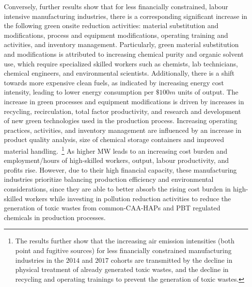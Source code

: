 \documentclass[12pt, english]{article}
\begin{document}
    Conversely, further results show that for less financially constrained, labour intensive manufacturing industries, there is a corresponding significant increase in the following green onsite reduction activities: material substitution and modifications, process and equipment modifications, operating training and activities, and inventory management. Particularly, green material substitution and modifications is attributed to increasing chemical purity and organic solvent use, which require specialized skilled workers such as chemists, lab technicians, chemical engineers, and environmental scientists. Additionally, there is a shift towards more expensive clean fuels, as indicated by increasing energy cost intensity, leading to lower energy consumption per $\$100m$ units of output. The increase in green processes and equipment modifications is driven by increases in recycling, recirculation, total factor productivity, and research and development of new green technologies used in the production process. Increasing operating practices, activities, and inventory management are influenced by an increase in product quality analysis, size of chemical storage containers and improved material handling.~\footnote{\tiny The results further show that the increasing air emission intensities (both point and fugitive sources) for less financially constrained manufacturing industries in the $2014$ and $2017$ cohorts are transmitted by the decline in physical treatment of already generated toxic wastes, and the decline in recycling and operating trainings to prevent the generation of toxic wastes.} As higher MW leads to an increasing cost burden and employment/hours of high-skilled workers, output, labour productivity, and profits rise. However, due to their high financial capacity, these manufacturing industries prioritize balancing production efficiency and environmental considerations, since they are able to better absorb the rising cost burden in high-skilled workers while investing in pollution reduction activities to reduce the generation of toxic wastes from common-CAA-HAPs and PBT regulated chemicals in production processes.
    
    
\end{document}
